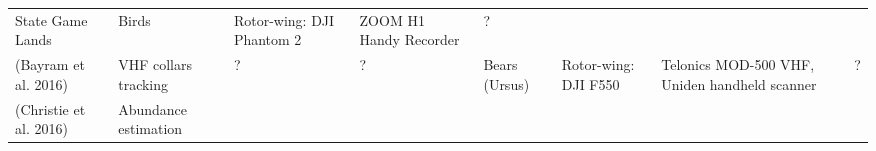 \documentclass[]{interact}
\theoremstyle{plain}%
\theoremstyle{definition}
\theoremstyle{remark}
\begin{document}
\begin{longtable}[]{@{}llllllll@{}}
\begin{minipage}[t]{0.14\columnwidth}
State Game Lands\strut
\end{minipage} & \begin{minipage}[t]{0.10\columnwidth}\raggedright\strut
Birds\strut
\end{minipage} & \begin{minipage}[t]{0.09\columnwidth}\raggedright\strut
Rotor-wing: DJI Phantom 2\strut
\end{minipage} & \begin{minipage}[t]{0.11\columnwidth}\raggedright\strut
ZOOM H1 Handy Recorder\strut
\end{minipage} & \begin{minipage}[t]{0.01\columnwidth}\raggedright\strut
?\strut
\end{minipage}\tabularnewline
\begin{minipage}[t]{0.11\columnwidth}\raggedright\strut
(Bayram et al. 2016)\strut
\end{minipage} & \begin{minipage}[t]{0.18\columnwidth}\raggedright\strut
VHF collars tracking\strut
\end{minipage} & \begin{minipage}[t]{0.03\columnwidth}\raggedright\strut
?\strut
\end{minipage} & \begin{minipage}[t]{0.14\columnwidth}\raggedright\strut
?\strut
\end{minipage} & \begin{minipage}[t]{0.10\columnwidth}\raggedright\strut
Bears (Ursus)\strut
\end{minipage} & \begin{minipage}[t]{0.09\columnwidth}\raggedright\strut
Rotor-wing: DJI F550\strut
\end{minipage} & \begin{minipage}[t]{0.11\columnwidth}\raggedright\strut
Telonics MOD-500 VHF, Uniden handheld scanner\strut
\end{minipage} & \begin{minipage}[t]{0.01\columnwidth}\raggedright\strut
?\strut
\end{minipage}\tabularnewline
\begin{minipage}[t]{0.11\columnwidth}\raggedright\strut
(Christie et al. 2016)\strut
\end{minipage} & \begin{minipage}[t]{0.18\columnwidth}\raggedright\strut
Abundance estimation\strut
\end{minipage} & \begin{minipage}[t]{0.03\columnwidth}\raggedright\strut

\end{minipage}
\end{longtable}
\end{document}
